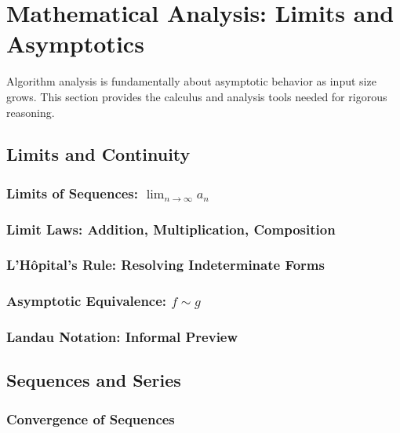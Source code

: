 \section{Mathematical Analysis: Limits and Asymptotics}
\label{sec:analysis}

\begin{sectionintro}
Algorithm analysis is fundamentally about asymptotic behavior as input size grows.
This section provides the calculus and analysis tools needed for rigorous reasoning.
\end{sectionintro}

\subsection{Limits and Continuity}
\label{subsec:limits}

\subsubsection{Limits of Sequences: $\lim_{n \to \infty} a_n$}
\subsubsection{Limit Laws: Addition, Multiplication, Composition}
\subsubsection{L'Hôpital's Rule: Resolving Indeterminate Forms}
\subsubsection{Asymptotic Equivalence: $f \sim g$}
\subsubsection{Landau Notation: Informal Preview}

\subsection{Sequences and Series}
\label{subsec:sequences-series}

\subsubsection{Convergence of Sequences}
